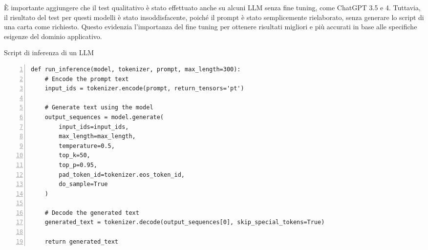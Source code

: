 \begin{table}[ht]
	\centering
	\vspace*{2mm}
	\caption{LLM a confronto}
	\label{tab:llm_inference}
\end{table}

È importante aggiungere che il test qualitativo è stato effettuato anche su alcuni LLM senza fine tuning, come ChatGPT 3.5 e 4. Tuttavia, il risultato del test per questi modelli è stato insoddisfacente, poiché il prompt è stato semplicemente rielaborato, senza generare lo script di una carta come richiesto. Questo evidenzia l'importanza del fine tuning per ottenere risultati migliori e più accurati in base alle specifiche esigenze del dominio applicativo.

\begin{algorithm}[ht]
	\caption{Script di inferenza di un LLM}
	\label{lst:inference}
	\begin{Verbatim}[numbers=left,breaklines]
def run_inference(model, tokenizer, prompt, max_length=300):
    # Encode the prompt text
    input_ids = tokenizer.encode(prompt, return_tensors='pt')
    
    # Generate text using the model
    output_sequences = model.generate(
        input_ids=input_ids,
        max_length=max_length,
        temperature=0.5,
        top_k=50,
        top_p=0.95,
        pad_token_id=tokenizer.eos_token_id,
        do_sample=True
    )
    
    # Decode the generated text
    generated_text = tokenizer.decode(output_sequences[0], skip_special_tokens=True)
    
    return generated_text
	\end{Verbatim}
\end{algorithm}

